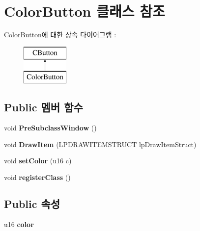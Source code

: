 \hypertarget{class_color_button}{}\section{Color\+Button 클래스 참조}
\label{class_color_button}
Color\+Button에 대한 상속 다이어그램 \+: \begin{figure}[H]
\begin{center}
\leavevmode
\includegraphics[height=2.000000cm]{class_color_button}
\end{center}
\end{figure}
\subsection*{Public 멤버 함수}
\begin{DoxyCompactItemize}
\item 
\mbox{\label{class_color_button_a2252acea0c111e198cc5bcc914e2cfeb}} 
void {\bfseries Pre\+Subclass\+Window} ()
\item 
\mbox{\label{class_color_button_a48b973ebb6644f474f64ff1e8fbb1adf}} 
void {\bfseries Draw\+Item} (L\+P\+D\+R\+A\+W\+I\+T\+E\+M\+S\+T\+R\+U\+CT lp\+Draw\+Item\+Struct)
\item 
\mbox{\label{class_color_button_a9ff5dc144a4acd5e2551ab94506b3bb0}} 
void {\bfseries set\+Color} (u16 c)
\item 
\mbox{\label{class_color_button_aabbc7306d4354479e0315b2a15026571}} 
void {\bfseries register\+Class} ()
\end{DoxyCompactItemize}
\subsection*{Public 속성}
\begin{DoxyCompactItemize}
\item 
\mbox{\label{class_color_button_ac2e59577aba7413fbf40c97f21df4835}} 
u16 {\bfseries color}
\end{DoxyCompactItemize}

